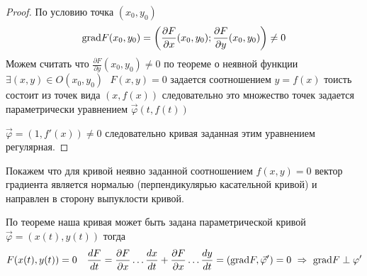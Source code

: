 \begin{proof}
  По условию  точка $(x_0, y_0)$
  $$
  \mathrm{grad} F(x_0, y_0) = \left( \frac{\partial F}{\partial x}(x_0, y_0);
  \frac{\partial F}{\partial y}(x_0, y_0) \right) \not= 0
  $$
  Можем считать что $\frac{\partial F}{\partial y}(x_0, y_0) \not= 0$ по
  теореме о неявной функции $\exists (x, y) \in O(x_0, y_0) ~~~ F(x, y) = 0$
  задается соотношением $y = f(x)$
  тоисть состоит из точек вида $(x, f(x))$ следовательно это множество точек
  задается параметрически уравнением $\vec \varphi (t, f(t))$

  $\vec \varphi = (1, f'(x)) \not= 0$ следовательно кривая заданная этим
  уравнением регулярная.
\end{proof}

Покажем что для кривой неявно заданной соотношением $f(x, y) = 0$ вектор
градиента является нормалью (перпендикулярью касательной кривой) и направлен в
сторону выпуклости кривой.

По теореме наша кривая может быть задана параметрической кривой
$\vec \varphi = (x(t), y(t))$ тогда
$$
F(x(t), y(t)) = 0 ~~~
\frac{dF}{dt} = \frac{\partial F}{\partial x} \dots \frac{dx}{dt} +
\frac{\partial F}{\partial x} \dots \frac{dy}{dt} =
(\mathrm{grad} F, \vec \varphi') = 0 ~ \Rightarrow ~ \mathrm{grad} F \perp \varphi'
$$